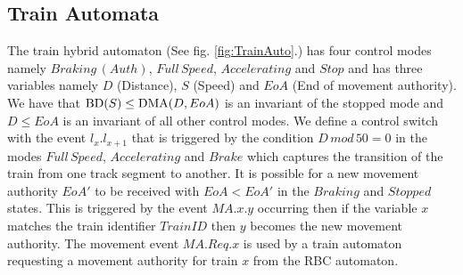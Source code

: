 \subsection*{Train Automata}
The train hybrid automaton (See fig. \ref{fig:TrainAuto}.) has four control modes namely $Braking \, (Auth)$, $Full \, Speed$, $Accelerating$ and $Stop$ and has three variables namely $D$ (Distance),  $S$ (Speed) and $EoA$ (End of movement authority). We have that $ \mathrm{BD}(S) \leq \mathrm{DMA}(D,EoA)$ is an invariant of the stopped mode and $D \leq EoA$ is an invariant of all other control modes. We define a control switch with the event $l_x.l_{x+1}$ that is triggered by the condition $D \, mod \, 50 = 0$ in the modes $Full \, Speed$, $Accelerating$ and $Brake$ which captures the transition of the train from one track segment to another. It is possible for a new movement authority $EoA'$ to be received with $EoA < EoA'$  in the $Braking$ and $Stopped$ states.  This is triggered by the event $MA.x.y$ occurring then if the variable $x$ matches the train identifier $TrainID$ then $y$ becomes the new movement authority. The movement event $MA.Req.x$ is used by a train automaton requesting a movement authority for train $x$ from the RBC automaton. 
\medskip
